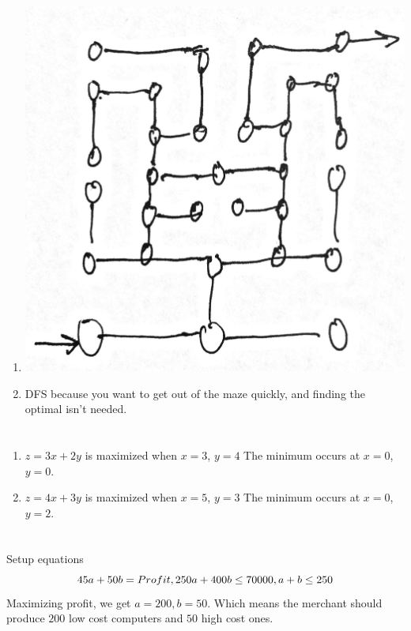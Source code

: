\documentclass[a4paper,12pt]{article}
\begin{document}
\section{}
\begin{enumerate}
  \item \includegraphics[width=15cm]{maze}
  \item DFS because you want to get out of the maze quickly, and finding the optimal
    isn't needed.
\end{enumerate}
\section{}
\begin{enumerate}
  \item $z = 3x + 2y$ is maximized when $x=3$, $y=4$
    The minimum occurs at $x=0$, $y=0$.
  \item $z = 4x + 3y$ is maximized when $x=5$, $y=3$
    The minimum occurs at $x=0$, $y=2$.
\end{enumerate}
\section{}
Setup equations
$$
  45a + 50b = Profit,\\
  250a + 400b \leq 70000,\\
  a + b \leq 250
$$
Maximizing profit, we get $a = 200, b = 50$.
Which means the merchant should produce $200$ low cost computers and $50$ high cost ones.
\end{document}
